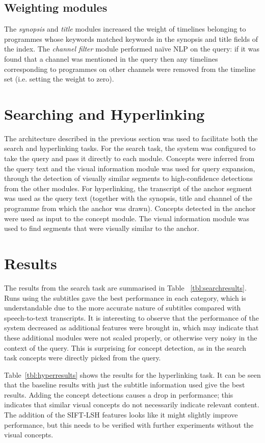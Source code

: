 \documentclass{../acm_proc_article-me11_tweaked}
\begin{document}
\subsection{Weighting modules}
The \emph{synopsis} and \emph{title} modules increased the weight of timelines belonging to programmes whose keywords matched keywords in the synopsis and title fields of the index. The \emph{channel filter} module performed naïve NLP on the query: if it was found that a channel was mentioned in the query then any 
timelines corresponding to programmes on other channels were removed from the 
timeline set (i.e. setting the weight to zero).

\section{Searching and Hyperlinking}
The architecture described in the previous section was used to facilitate both the search and hyperlinking tasks. For the search task, the system was configured to take the query and pass it directly to each module. Concepts were inferred from the 
query text and the visual information module was used for query expansion, through the detection of visually similar segments to high-confidence detections from the other modules. For hyperlinking, the transcript of the anchor segment was used as the query text (together with the synopsis, title and channel of the programme from which the anchor was drawn). Concepts detected in the anchor were used as input to the concept module. The visual information module was used to find segments that were visually similar to the anchor. 

\section{Results}
The results from the search task are summarised in Table~
\ref{tbl:searchresults}. Runs using the subtitles gave the best performance in 
each category, which is understandable due to the more accurate nature of 
subtitles compared with speech-to-text transcripts. It is interesting to 
observe that the performance of the system decreased as additional features 
were brought in, which may indicate that these additional modules were not 
scaled properly, or otherwise very noisy in the context of the query. This is 
surprising for concept detection, as in the search task concepts were directly 
picked from the query.

Table~\ref{tbl:hyperresults} shows the results for the hyperlinking 
task. It can be seen that the baseline results with just the subtitle 
information used give the best results. Adding the concept detections 
causes a drop in performance; this indicates that similar visual concepts
do not necessarily indicate relevant content. The addition of the SIFT-LSH
features looks like it might slightly improve performance, but this needs to 
be verified with further experiments without the visual concepts.
\end{document}
